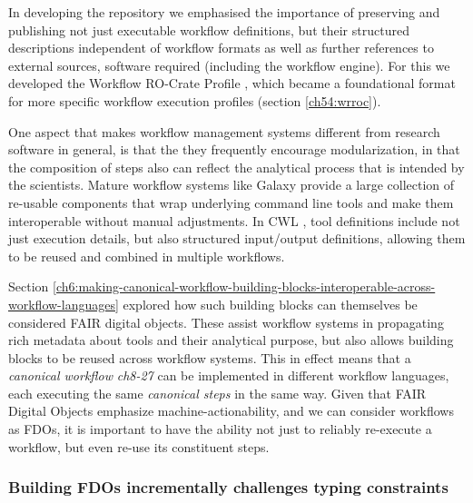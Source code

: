 In developing the repository  \cite{Goble 2021} we emphasised the importance of preserving and publishing not just executable workflow definitions, 
but their structured descriptions independent of workflow formats as well as further references to external sources, software required (including the workflow engine).
For this we developed the Workflow RO-Crate Profile \cite{Bacall 2022}, which became a foundational format for more specific workflow execution profiles (section \vref{ch54:wrroc}).

One aspect that makes workflow management systems different from research software in general, is that the they frequently encourage modularization, in that the composition of steps also can reflect the analytical process that is intended by the scientists.
Mature workflow systems like Galaxy \cite{Galaxy 2022} provide a large collection of re-usable components that wrap underlying command line tools and make them interoperable without manual adjustments. 
In CWL  \cite{Crusoe 2022}, tool definitions include not just execution details, but also structured input/output definitions, allowing them to be reused and combined in multiple workflows.

Section \vref{ch6:making-canonical-workflow-building-blocks-interoperable-across-workflow-languages} explored how such building blocks can themselves be considered FAIR digital objects. These assist workflow systems in propagating rich metadata about tools and their analytical purpose, but also allows building blocks to be reused across workflow systems. This in effect means that a \emph{canonical workflow} \emph{ch8-27} can be implemented in different workflow languages, each executing the same \emph{canonical steps} in the same way. Given that FAIR Digital Objects emphasize machine-actionability, and we can consider workflows as FDOs, it is important to have the ability not just to reliably re-execute a workflow, but even re-use its constituent steps. 


\subsubsection{Building FDOs incrementally challenges typing constraints}
\label{ch61:buildingfdo}

